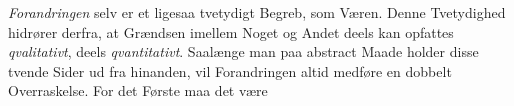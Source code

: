 \documentclass[12pt]{book}
\newcommand{\opage}[1]{\marginnote{\footnotesize\textit{[#1]}}}
\begin{document}
\emph{Forandringen} selv er et ligesaa tvetydigt Begreb, som Væren. Denne Tvetydighed
hidrører derfra, at Grændsen imellem Noget og Andet deels kan opfattes
\emph{qvalitativt}, deels \emph{qvantitativt}. Saalænge man paa abstract Maade holder
disse tvende Sider ud fra hinanden, vil Forandringen altid medføre en dobbelt
Overraskelse. For det Første maa det være
\opage{118} %
\end{document}
